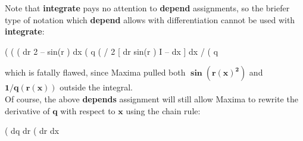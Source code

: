 \documentclass[12pt]{article}
\begin{document}
Note that \textbf{integrate} pays no attention to \textbf{depend} assignments,
  so the briefer type of notation which \textbf{depend} allows with differentiation
  cannot be used with \textbf{integrate}:
\begin{myVerbatim}
(%
(%
(%
                                  dr      2
                                  -- sin(r )
                                  dx
(%
                                      q
(%
                                        /
                                     2  [ dr
                                sin(r ) I -- dx
                                        ] dx
                                        /
(%
                                       q
\end{myVerbatim} 
which is fatally flawed, since Maxima pulled both $\mathbf{\boldsymbol{\sin}(r(x)^2)}$
 and $\mathbf{1/q(r(x))}$ outside the integral.\\
  
\noindent Of course, the above \textbf{depends} assignment will still allow Maxima
  to rewrite the derivative of $\mathbf{q}$ with respect to $\mathbf{x}$ using the chain rule:
\begin{myVerbatim}
(%
                                     dq dr
(%
                                     dr dx
\end{myVerbatim} 
\newpage
\end{document}
